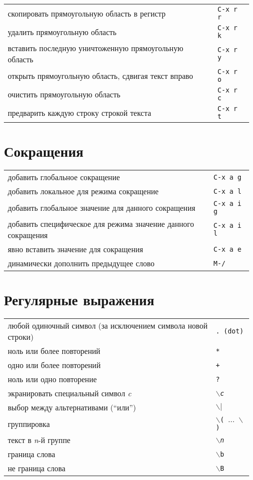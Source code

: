 \documentclass[10pt]{article}
\newlength{\ColWidth}
\newcommand{\kbd}[1]{\texttt{#1}}
\begin{document}
\begin{tabular}{p{\ColWidth}l}
скопировать прямоугольную область в регистр & \kbd{C-x r r} \\
удалить прямоугольную область & \kbd{C-x r k} \\
вставить последную уничтоженную прямоугольную область & \kbd{C-x r y} \\
открыть прямоугольную область, сдвигая текст вправо & \kbd{C-x r o} \\
очистить прямоугольную область & \kbd{C-x r c} \\
предварить каждую строку строкой текста & \kbd{C-x r t} \\
\end{tabular}

\section{Сокращения}

\begin{tabular}{p{\ColWidth}l}
добавить глобальное сокращение & \kbd{C-x a g} \\
добавить локальное для режима сокращение & \kbd{C-x a l} \\
добавить глобальное значение для данного сокращения & \kbd{C-x a i g} \\
добавить специфическое для режима значение данного сокращения & \kbd{C-x a i l} \\
явно вставить значение для сокращения & \kbd{C-x a e} \\

динамически дополнить предыдущее слово & \kbd{M-/} \\
\end{tabular}

\section{Регулярные выражения}

\begin{tabular}{p{\ColWidth}l}
любой одиночный символ (за исключением символа новой строки) & \kbd{. {\rm(dot)}} \\
ноль или более повторений & \kbd{*} \\
одно или более повторений & \kbd{+} \\
ноль или одно повторение & \kbd{?} \\
экранировать специальный символ {\it c\/} & \kbd{$\backslash${\it c}} \\
выбор между альтернативами (``или'') & \kbd{$\backslash|$} \\
группировка & \kbd{$\backslash$( {\rm$\ldots$} $\backslash$)} \\
текст в {\it n\/}-й группе & \kbd{$\backslash${\it n}} \\
граница слова & \kbd{$\backslash$b} \\
не граница слова & \kbd{$\backslash$B} \\
\end{tabular}
\end{document}
